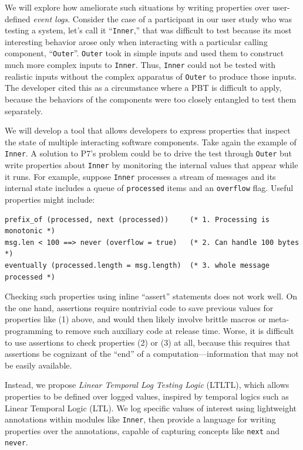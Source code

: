 We will explore
how ameliorate such situations by writing properties over user-defined
{\em event logs}. Consider
the case of a participant in our user
study who was testing
a system, let's call it ``\lstinline{Inner},'' that  was difficult to
test because
its most interesting behavior arose only when interacting with a particular calling
component, ``\lstinline{Outer}''.
\lstinline{Outer} took in simple inputs and used them to construct
much more complex inputs to \lstinline{Inner}. Thus, \lstinline{Inner}
could not be tested with
realistic inputs without the complex apparatus of \lstinline{Outer} to
produce those inputs.  The developer cited this as a circumstance where a
PBT is difficult to apply, because the behaviors of the components were too
closely entangled to test them separately.

We will develop a tool that allows developers to express properties that inspect
the state of multiple interacting software components. Take again the example of
\lstinline{Inner}. A solution to P7's problem could be to drive the
test through \lstinline{Outer} but write properties about
\lstinline{Inner} by monitoring the internal values that appear while it
runs. For example, suppose
\lstinline{Inner} processes a stream of messages and its internal state
includes a queue of \lstinline{processed} items and an
\lstinline{overflow} flag. Useful properties might include:

\begin{lstlisting}
prefix_of (processed, next (processed))     (* 1. Processing is monotonic *)
msg.len < 100 ==> never (overflow = true)   (* 2. Can handle 100 bytes    *)
eventually (processed.length = msg.length)  (* 3. whole message processed *)
\end{lstlisting}

Checking such properties using inline ``assert'' statements
does not work well. On the one hand, assertions
require nontrivial code to save previous values for properties like (1)
above, and would then likely involve brittle macros or meta-programming to remove such
auxiliary code at release time. Worse, it is difficult to use
assertions to check properties (2) or (3) at all, because this
requires that assertions be cognizant of the ``end'' of a
computation---information that may not be easily available.

Instead, we propose {\em Linear Temporal Log Testing Logic} (LTLTL), which allows
properties to be defined over logged values, inspired by temporal
logics such as Linear Temporal Logic (LTL).  We
log specific values of interest using lightweight annotations
within modules like \lstinline{Inner}, then provide a language for
writing properties over the annotations, capable of capturing concepts like
\lstinline{next} and \lstinline{never}.

